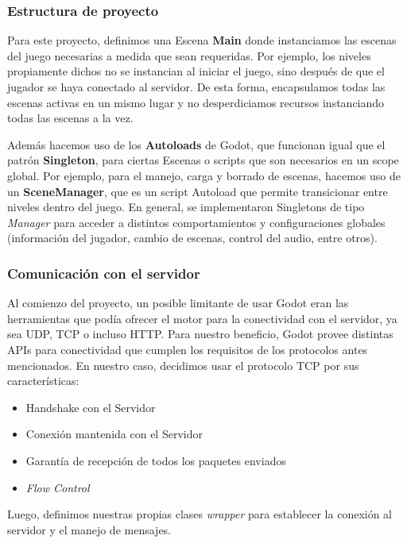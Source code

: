 \subsubsection{Estructura de proyecto}

\noindent Para este proyecto, definimos una Escena \textbf{Main} donde instanciamos las escenas del juego necesarias 
a medida que sean requeridas. Por ejemplo, los niveles propiamente dichos no se instancian al iniciar el 
juego, sino después de que el jugador se haya conectado al servidor. De esta forma, encapsulamos todas las 
escenas activas en un mismo lugar y no desperdiciamos recursos instanciando todas las escenas a la vez.

Además hacemos uso de los \textbf{Autoloads} de Godot, que funcionan igual que el patrón \textbf{Singleton}, 
para ciertas Escenas o scripts que son necesarios en un scope global. Por ejemplo, para el manejo, carga 
y borrado de escenas, hacemos uso de un \textbf{SceneManager}, que es un script Autoload que permite 
transicionar entre niveles dentro del juego. En general, se implementaron Singletons de tipo \textit{Manager}
para acceder a distintos comportamientos y configuraciones globales (información del jugador, cambio de 
escenas, control del audio, entre otros).

\subsubsection{Comunicación con el servidor}

\noindent Al comienzo del proyecto, un posible limitante de usar Godot eran las herramientas que podía ofrecer 
el motor para la conectividad con el servidor, ya sea UDP, TCP o incluso HTTP. 
Para nuestro beneficio, Godot provee distintas APIs para conectividad que cumplen los requisitos
de los protocolos antes mencionados. En nuestro caso, decidimos usar el protocolo TCP por sus características:
\begin{itemize}
    \item Handshake con el Servidor
    \item Conexión mantenida con el Servidor
    \item Garantía de recepción de todos los paquetes enviados
    \item \textit{Flow Control}
\end{itemize}

Luego, definimos nuestras propias clases \textit{wrapper} para establecer la conexión al servidor y el 
manejo de mensajes. 

